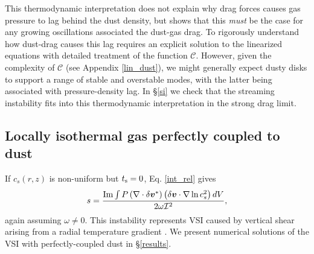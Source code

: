
This thermodynamic interpretation does not explain 
why drag forces causes gas pressure to lag behind the dust
density, but shows 
that this \emph{must} be the case for any growing oscillations associated the
dust-gas drag. To rigorously understand how dust-drag causes this 
lag requires an explicit solution to the linearized equations with 
detailed treatment of the function $\mathcal{C}$. However, given the complexity of
$\mathcal{C}$ (see Appendix \ref{lin_dust}), we might generally expect
 dusty disks to  support a range of stable and overstable modes, with the
latter being associated with pressure-density lag. 
 In \S\ref{si} we check that the
streaming instability fits into this thermodynamic interpretation in
the strong drag limit.  






\subsection{Locally isothermal gas perfectly coupled to dust}\label{dusty_vsi_int}
If $c_s(r,z)$ is non-uniform but $t_\mathrm{s}=0$, Eq. \ref{int_rel} 
gives  
\begin{align}
  s = \frac{\operatorname{Im}\int P
    \left(\nabla\cdot\delta\bm{v}^*\right)\left(\delta\bm{v}\cdot\nabla\ln{c_s^2}\right)dV}{2\omega\mathcal{I}^2}, \label{vsi_check} 
\end{align} 
again assuming $\omega\neq0$. 
This instability represents VSI caused by vertical shear arising from a radial
temperature gradient \citep{nelson13,barker15,lin15}. We present 
numerical solutions of the VSI with perfectly-coupled dust in \S\ref{results}. 
